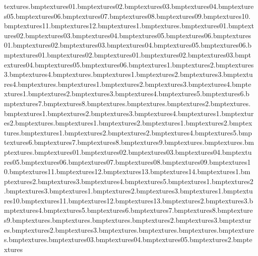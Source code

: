 textures\antanae.bmp textures\anvilhuge01.bmp textures\anvilhuge02.bmp textures\anvilhuge03.bmp textures\anvilhuge04.bmp textures\anvilhuge05.bmp textures\anvilhuge06.bmp textures\anvilhuge07.bmp textures\anvilhuge08.bmp textures\anvilhuge09.bmp textures\anvilhuge10.bmp textures\anvilhuge11.bmp textures\anvilhuge12.bmp textures\arch1.bmp textures\arrow.bmp textures\blucage01.bmp textures\blucage02.bmp textures\blucage03.bmp textures\blucage04.bmp textures\blucage05.bmp textures\blucage06.bmp textures\bluhut01.bmp textures\bluhut02.bmp textures\bluhut03.bmp textures\bluhut04.bmp textures\bluhut05.bmp textures\bluhut06.bmp textures\bluhutdoor01.bmp textures\bluhutdoor02.bmp textures\bluhutwin01.bmp textures\bluhutwin02.bmp textures\bluhutwin03.bmp textures\bluhutwin04.bmp textures\bluhutwin05.bmp textures\bluhutwin06.bmp textures\bridge1.bmp textures\bridge2.bmp textures\bridge3.bmp textures\bridge4.bmp textures\bridgeside.bmp textures\bridgesnow1.bmp textures\bridgesnow2.bmp textures\bridgesnow3.bmp textures\bridgesnow4.bmp textures\bridsidextra.bmp textures\bridsnowedge1.bmp textures\bridsnowedge2.bmp textures\bridsnowedge3.bmp textures\bridsnowedge4.bmp textures\browtree1.bmp textures\browtree2.bmp textures\browtree3.bmp textures\browtree4.bmp textures\browtree5.bmp textures\browtree6.bmp textures\browtree7.bmp textures\browtree8.bmp textures\browtreebig.bmp textures\burgersign.bmp textures\burgersign2.bmp textures\cagebars.bmp textures\cagedoor1.bmp textures\cagedoor2.bmp textures\cagedoor3.bmp textures\cagedoor4.bmp textures\carzywall1.bmp textures\carzywall2.bmp textures\chickleg.bmp textures\clangersign1.bmp textures\clangersign2.bmp textures\cornerwall1.bmp textures\cornerwall2.bmp textures\crackwile.bmp textures\creamwall1.bmp textures\creamwall2.bmp textures\dangeranvils2.bmp textures\dangeranvils4.bmp textures\dangeranvils5.bmp textures\dangeranvils6.bmp textures\dangeranvils7.bmp textures\dangeranvils8.bmp textures\dangeranvils9.bmp textures\dangercross.bmp textures\dangertarget.bmp textures\dangertargetsand.bmp textures\dirttosand01.bmp textures\dirttosand02.bmp textures\dirttosand03.bmp textures\dirttosand04.bmp textures\dirttosand05.bmp textures\dirttosand06.bmp textures\dirttosand07.bmp textures\dirttosand08.bmp textures\dirttosand09.bmp textures\dirttosand10.bmp textures\dirttosand11.bmp textures\dirttosand12.bmp textures\dirttosand13.bmp textures\dirttosand14.bmp textures\earth1.bmp textures\earth2.bmp textures\earth3.bmp textures\earth4.bmp textures\earth5.bmp textures\eartskel1.bmp textures\eartskel2.bmp textures\eartskel3.bmp textures\elecbox1.bmp textures\elecbox2.bmp textures\elecbox3.bmp textures\elechut1.bmp textures\elechut10.bmp textures\elechut11.bmp textures\elechut12.bmp textures\elechut13.bmp textures\elechut2.bmp textures\elechut3.bmp textures\elechut4.bmp textures\elechut5.bmp textures\elechut6.bmp textures\elechut7.bmp textures\elechut8.bmp textures\elechut9.bmp textures\elecloop.bmp textures\fblu.bmp textures\fence.bmp textures\fence2.bmp textures\fence3.bmp textures\fencesnow.bmp textures\fencesnow2.bmp textures\fencesnow3.bmp textures\fgre.bmp textures\flash.bmp textures\fpurp.bmp textures\fred.bmp textures\frozentreats.bmp textures\frozentreats03.bmp textures\frozentreats04.bmp textures\frozentreats05.bmp textures\frozentreats2.bmp textures